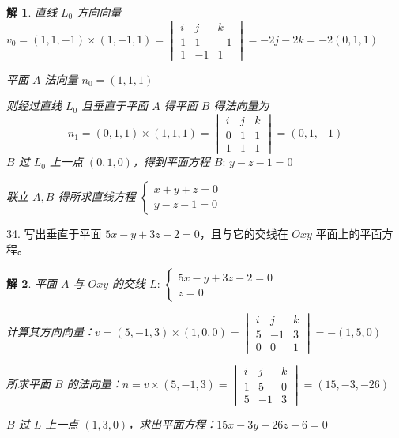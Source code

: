 \documentclass[a4paper,12pt]{article}
\newtheorem*{解}{解}
\begin{document}
\begin{解}
直线 $L_0$ 方向向量 $v_0=(1,1,-1)\times(1,-1,1)=\begin{vmatrix}
        i & j  & k  \\
        1 & 1  & -1 \\
        1 & -1 & 1
    \end{vmatrix}=-2j-2k=-2(0,1,1)$

平面 $A$ 法向量 $n_0=(1,1,1)$

则经过直线 $L_0$ 且垂直于平面 $A$ 得平面 $B$ 得法向量为 $$n_1=(0,1,1)\times(1,1,1)=\begin{vmatrix}
        i & j & k \\
        0 & 1 & 1 \\
        1 & 1 & 1
    \end{vmatrix}=(0,1,-1)$$
$B$ 过 $L_0$ 上一点 $(0,1,0)$，得到平面方程 $B:\,y-z-1=0$

联立 $A,B$ 得所求直线方程 $\begin{cases}
        x+y+z=0 \\
        y-z-1=0
    \end{cases}$
\end{解}

34. 写出垂直于平面 $5x - y + 3z - 2 = 0$，且与它的交线在 $Oxy$ 平面上的平面方程。

\begin{解}
平面 $A$ 与 $Oxy$ 的交线 $L:\,\begin{cases}
        5x - y + 3z - 2 = 0 \\
        z=0
    \end{cases}$

计算其方向向量：$v=(5,-1,3)\times(1,0,0)=\begin{vmatrix}
        i & j  & k \\
        5 & -1 & 3 \\
        0 & 0  & 1
    \end{vmatrix}=-(1,5,0)$

所求平面 $B$ 的法向量：$n=v\times(5,-1,3)=\begin{vmatrix}
        i & j  & k \\
        1 & 5  & 0 \\
        5 & -1 & 3
    \end{vmatrix}=(15,-3,-26)$

$B$ 过 $L$ 上一点 $(1,3,0)$，求出平面方程：$15x-3y-26z-6=0$
\end{解}
\end{document}
